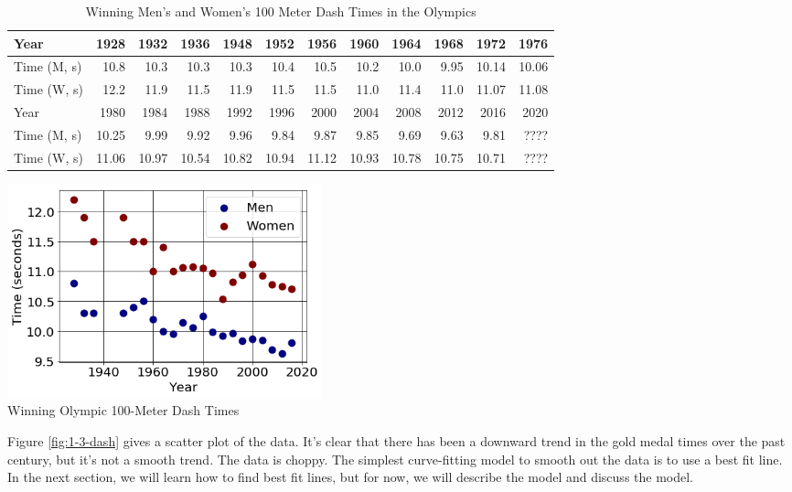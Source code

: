 \begin{table}[h!]
\centering
\begin{tabular}{l*{11}{r}}
\toprule
Year        & 1928 & 1932 & 1936 & 1948 & 1952 & 1956 & 1960 & 1964 & 1968 & 1972  & 1976 \\
\midrule
Time (M, s) & 10.8 & 10.3 & 10.3 & 10.3 & 10.4 & 10.5 & 10.2 & 10.0 & 9.95 & 10.14 & 10.06 \\
\midrule
Time (W, s) & 12.2 & 11.9 & 11.5 & 11.9 & 11.5 & 11.5 & 11.0 & 11.4 & 11.0 & 11.07 & 11.08 \\
\bottomrule
Year        &  1980 & 1984 & 1988 & 1992 & 1996 & 2000 & 2004 & 2008 & 2012 & 2016 & 2020 \\
\midrule
Time (M, s) & 10.25 & 9.99 & 9.92 & 9.96 & 9.84 & 9.87 & 9.85 & 9.69 & 9.63 & 9.81 & ???? \\
\midrule
Time (W, s) & 11.06 & 10.97 & 10.54 & 10.82 & 10.94 & 11.12 & 10.93 & 10.78 & 10.75 & 10.71 & ???? \\
\bottomrule
\end{tabular}
\caption{Winning Men's and Women's 100 Meter Dash Times in the Olympics}
\label{tab:1-3-dash}
\end{table}

\begin{floatingfigure}{0.4\textwidth}
    \centering
    \includegraphics[width=0.4\textwidth]{img/chap1/sec1-3/fig1-3-dash.png}\\
    \caption{Winning Olympic 100-Meter Dash Times}
    \label{fig:1-3-dash}
    \vspace{-20pt}
\end{floatingfigure}
Figure \ref{fig:1-3-dash} gives a scatter plot of the data. It's clear that there has been a downward trend in the gold medal times over the past century, but it's not a smooth trend. The data is choppy. The simplest curve-fitting model to smooth out the data is to use a best fit line. In the next section, we will learn how to find best fit lines, but for now, we will describe the model and discuss the model.

